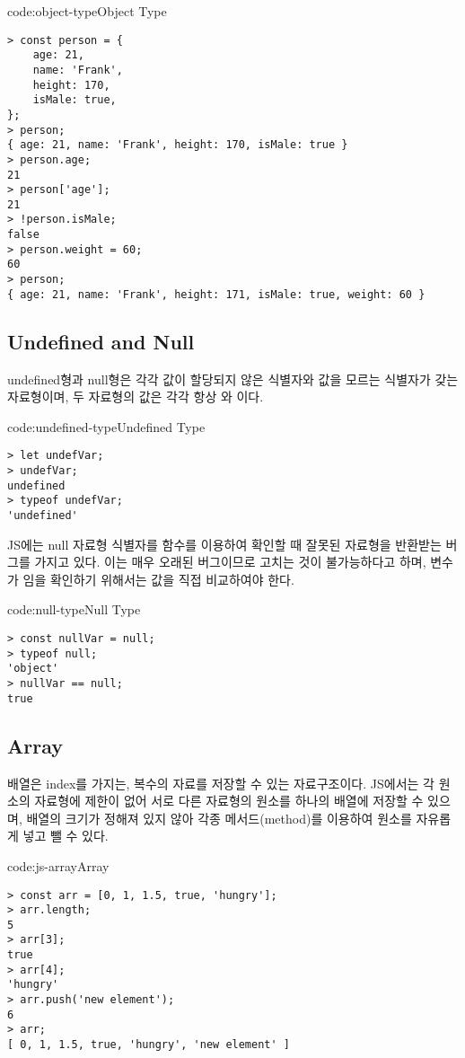 \begin{codeenv}{code:object-type}{Object Type}\begin{verbatim}
> const person = {
    age: 21,
    name: 'Frank',
    height: 170,
    isMale: true,
};
> person;
{ age: 21, name: 'Frank', height: 170, isMale: true }
> person.age;
21
> person['age'];
21
> !person.isMale;
false
> person.weight = 60;
60
> person;
{ age: 21, name: 'Frank', height: 171, isMale: true, weight: 60 }
\end{verbatim}
\end{codeenv}

\subsection*{Undefined and Null}

undefined형과 null형은 각각 값이 할당되지 않은 식별자와 값을 모르는 식별자가 갖는 자료형이며, 두 자료형의 값은 각각 항상 와 이다.

\begin{codeenv}{code:undefined-type}{Undefined Type}\begin{verbatim}
> let undefVar;
> undefVar;
undefined
> typeof undefVar;
'undefined'
\end{verbatim}
\end{codeenv}

JS에는 null 자료형 식별자를  함수를 이용하여 확인할 때 잘못된 자료형을 반환받는 버그를 가지고 있다. 이는 매우 오래된 버그이므로 고치는 것이 불가능하다고 하며, 변수가 임을 확인하기 위해서는 값을 직접 비교하여야 한다.


\begin{codeenv}{code:null-type}{Null Type}\begin{verbatim}
> const nullVar = null;
> typeof null;
'object'
> nullVar == null;
true
\end{verbatim}
\end{codeenv}

\subsection*{Array}

배열은 index를 가지는, 복수의 자료를 저장할 수 있는 자료구조이다. JS에서는 각 원소의 자료형에 제한이 없어 서로 다른 자료형의 원소를 하나의 배열에 저장할 수 있으며, 배열의 크기가 정해져 있지 않아 각종 메서드(method)를 이용하여 원소를 자유롭게 넣고 뺄 수 있다.

\begin{codeenv}{code:js-array}{Array}\begin{verbatim}
> const arr = [0, 1, 1.5, true, 'hungry'];
> arr.length;
5
> arr[3];
true
> arr[4];
'hungry'
> arr.push('new element');
6
> arr;
[ 0, 1, 1.5, true, 'hungry', 'new element' ]
\end{verbatim}
\end{codeenv}

